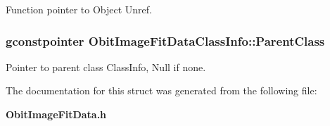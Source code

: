 Function pointer to Object Unref. 

\subsubsection{\setlength{\rightskip}{0pt plus 5cm}gconstpointer {\bf Obit\-Image\-Fit\-Data\-Class\-Info::Parent\-Class}}\label{structObitImageFitDataClassInfo_o3}


Pointer to parent class Class\-Info, Null if none. 



The documentation for this struct was generated from the following file:\begin{CompactItemize}
\item 
{\bf Obit\-Image\-Fit\-Data.h}\end{CompactItemize}
